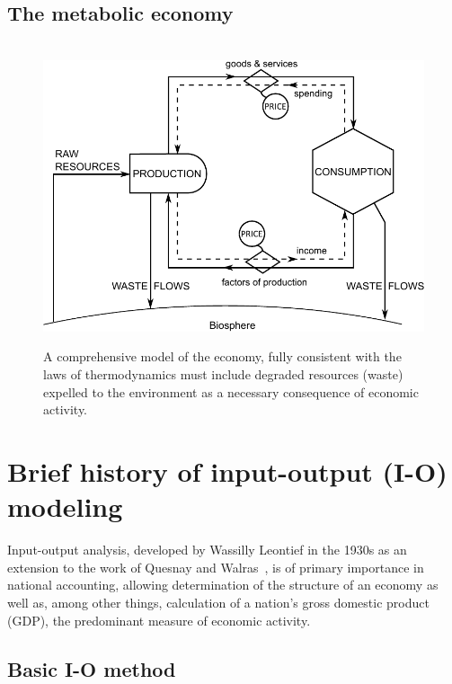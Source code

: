\subsection{The metabolic economy}

\begin{figure}[!ht]
\centering\
\includegraphics[width=\linewidth]{Part_0/Chapter_Introduction/images/PERKS.pdf}
\caption[A comprehensive biophysical (?) model of the economy]{A comprehensive model 
of the economy, fully consistent with the laws of thermodynamics 
must include degraded resources (waste) expelled 
to the environment as a necessary consequence of economic activity.}
\label{fig:metabolic_economy}
\end{figure}


\section{Brief history of input-output (I-O) modeling}

Input-output analysis, developed by Wassilly Leontief in the 1930s 
as an extension to the work of Quesnay and Walras~\cite{Leontief1936}, 
is of primary importance in national accounting, 
allowing determination of the structure of an economy as well as, 
among other things, 
calculation of a nation's gross domestic product (GDP), 
the predominant measure of economic activity.








\subsection{Basic I-O method}

